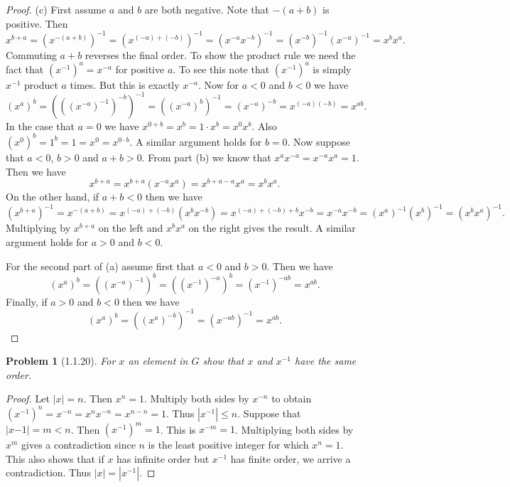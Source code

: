 \documentclass{article}
\newtheorem{problem}{Problem}
\begin{document}
\begin{proof}
(c) First assume $a$ and $b$ are both negative. Note that $-(a+b)$ is positive. Then
\[
x^{b+a} = \left ( x^{-(a+b)} \right )^{-1} = \left (x^{(-a) + (-b)} \right )^{-1} = \left (x^{-a}x^{-b} \right )^{-1} = \left (x^{-b} \right )^{-1} \left (x^{-a} \right )^{-1} = x^bx^a.
\]
Commuting $a+b$ reverses the final order. To show the product rule we need the fact that $(x^{-1})^a = x^{-a}$ for positive $a$. To see this note that $(x^{-1})^a$ is simply $x^{-1}$ product $a$ times. But this is exactly $x^{-a}$. Now for $a < 0$ and $b < 0$ we have
\[
\left (x^a \right )^b = \left ( \left ( \left ( x^{-a} \right )^{-1} \right )^{-b} \right )^{-1} = \left ( \left (x^{-a} \right )^b \right )^{-1} = (x^{-a})^{-b} = x^{(-a)(-b)} = x^{ab}.
\]
In the case that $a = 0$ we have $x^{0 + b} = x^b = 1 \cdot x^b = x^0x^b$. Also $(x^0)^b = 1^b = 1 = x^0 = x^{0 \cdot b}$. A similar argument holds for $b = 0$. Now suppose that $a < 0$, $b > 0$ and $a+b > 0$. From part (b) we know that $x^ax^{-a} = x^{-a}x^a = 1$. Then we have
\[
x^{b+a} = x^{b+a}(x^{-a}x^a) = x^{b+a-a}x^a = x^bx^a.
\]
On the other hand, if $a+b < 0$ then we have
\[
\left (x^{b+a} \right )^{-1} = x^{-(a+b)} = x^{(-a)+(-b)}(x^{b}x^{-b}) = x^{(-a)+(-b)+b}x^{-b} = x^{-a}x^{-b} = \left (x^a \right )^{-1} \left (x^b \right )^{-1} = \left (x^bx^a \right)^{-1}.
\]
Multiplying by $x^{b+a}$ on the left and $x^bx^a$ on the right gives the result. A similar argument holds for $a > 0$ and $b < 0$.

For the second part of (a) assume first that $a < 0$ and $b > 0$. Then we have
\[
\left (x^a \right )^b = \left ( \left (x^{-a} \right )^{-1} \right )^b = \left ( \left (x^{-1} \right )^{-a} \right )^b = \left (x^{-1} \right )^{-ab} = x^{ab}.
\]
Finally, if $a > 0$ and $b < 0$ then we have
\[
\left (x^a \right )^b = \left ( \left (x^a \right )^{-b} \right )^{-1} = \left (x^{-ab} \right )^{-1} = x^{ab}.
\]
\end{proof}

\begin{problem}[1.1.20]
For $x$ an element in $G$ show that $x$ and $x^{-1}$ have the same order.
\end{problem}
\begin{proof}
Let $|x| = n$. Then $x^n = 1$. Multiply both sides by $x^{-n}$ to obtain $(x^{-1})^n = x^{-n} = x^n x^{-n} = x^{n-n} = 1$. Thus $|x^{-1}| \leq n$. Suppose that $|x{-1}| = m < n$. Then $(x^{-1})^m = 1$. This is $x^{-m} = 1$. Multiplying both sides by $x^m$ gives a contradiction since $n$ is the least positive integer for which $x^n = 1$. This also shows that if $x$ has infinite order but $x^{-1}$ has finite order, we arrive a contradiction. Thus $|x| = |x^{-1}|$.
\end{proof}
\end{document}
